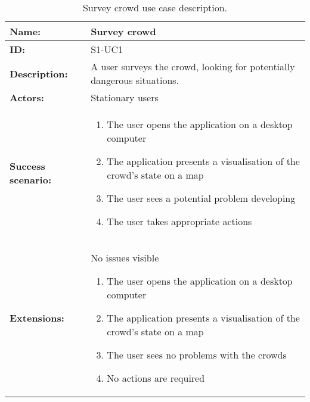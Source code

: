 \begin{table}[htbp]
    \centering
    \begin{tabularx}{\textwidth}{l X}
        \toprule
        \textbf{Name:}  & Survey crowd \\ \midrule
        \textbf{ID:}    & S1-UC1 \\ \midrule
        \textbf{Description:} & A user surveys the crowd, looking for potentially dangerous situations. \\ \midrule
        \textbf{Actors:} & Stationary users \\ \midrule
        \textbf{Success scenario:} & 
        \begin{enumerate}
            \item The user opens the application on a desktop computer
            \item The application presents a visualisation of the crowd's state on a map
            \item The user sees a potential problem developing
            \item The user takes appropriate actions
        \end{enumerate}
        \\ \midrule
        \textbf{Extensions:} & No issues visible
        \begin{enumerate}
            \item The user opens the application on a desktop computer
            \item The application presents a visualisation of the crowd's state on a map
            \item The user sees no problems with the crowds
            \item No actions are required
        \end{enumerate} 
        \\ \bottomrule
    \end{tabularx}
    \caption{Survey crowd use case description.}
    \label{tab:s1-uc1}
\end{table}